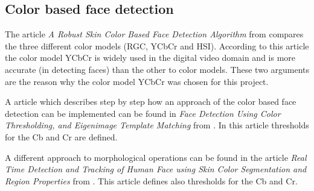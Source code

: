 \documentclass[Bachelorarbeit.tex]{subfiles}
\begin{document}
\subsection{Color based face detection}
The article \textit{A Robust Skin Color Based Face Detection Algorithm} from \cite{RobustSkinColorFD} compares the three different color models (RGC, YCbCr and HSI). According to this article the color model YCbCr is widely used in the digital video domain and is more accurate (in detecting faces) than the other to color models. These two arguments are the reason why the color model YCbCr was chosen for this project.\bigskip 

A article which describes step by step how an approach of the color based face detection can be implemented can be found in \textit{Face Detection Using Color Thresholding, and Eigenimage Template Matching} from \cite{ColorAndEigenimage}. In this article thresholds for the Cb and Cr are defined.\bigskip 

A different approach to morphological operations can be found in the article \textit{Real Time Detection and Tracking of Human Face using Skin Color Segmentation and Region Properties} from \cite{RTFaceDetection}. This article defines also thresholds for the Cb and Cr.
\end{document}

